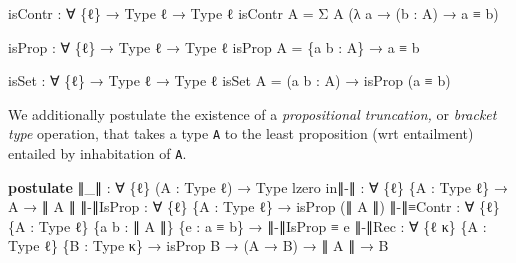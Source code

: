 \documentclass[
  11pt,
  oneside,
  article]{memoir}
\newenvironment{Shaded}{}{}
\newcommand{\KeywordTok}[1]{\textcolor[rgb]{0.00,0.44,0.13}{\textbf{#1}}}
\newcommand{\NormalTok}[1]{#1}
\newcommand{\OtherTok}[1]{\textcolor[rgb]{0.00,0.44,0.13}{#1}}
\theoremstyle{definition}
\theoremstyle{plain}
\newcommand{\0}{\textsf{0}}
\newcommand{\1}{\tn{\textsf{1}}}
\begin{document}
\begin{Shaded}
\begin{Highlighting}[]
\NormalTok{isContr }\OtherTok{:} \OtherTok{∀} \OtherTok{\{}\NormalTok{ℓ}\OtherTok{\}} \OtherTok{→}\NormalTok{ Type ℓ }\OtherTok{→}\NormalTok{ Type ℓ}
\NormalTok{isContr A }\OtherTok{=}\NormalTok{ Σ A }\OtherTok{(λ}\NormalTok{ a }\OtherTok{→} \OtherTok{(}\NormalTok{b }\OtherTok{:}\NormalTok{ A}\OtherTok{)} \OtherTok{→}\NormalTok{ a ≡ b}\OtherTok{)}

\NormalTok{isProp }\OtherTok{:} \OtherTok{∀} \OtherTok{\{}\NormalTok{ℓ}\OtherTok{\}} \OtherTok{→}\NormalTok{ Type ℓ }\OtherTok{→}\NormalTok{ Type ℓ}
\NormalTok{isProp A }\OtherTok{=} \OtherTok{\{}\NormalTok{a b }\OtherTok{:}\NormalTok{ A}\OtherTok{\}} \OtherTok{→}\NormalTok{ a ≡ b}

\NormalTok{isSet }\OtherTok{:} \OtherTok{∀} \OtherTok{\{}\NormalTok{ℓ}\OtherTok{\}} \OtherTok{→}\NormalTok{ Type ℓ }\OtherTok{→}\NormalTok{ Type ℓ}
\NormalTok{isSet A }\OtherTok{=} \OtherTok{(}\NormalTok{a b }\OtherTok{:}\NormalTok{ A}\OtherTok{)} \OtherTok{→}\NormalTok{ isProp }\OtherTok{(}\NormalTok{a ≡ b}\OtherTok{)}
\end{Highlighting}
\end{Shaded}

We additionally postulate the existence of a \emph{propositional
truncation,} or \emph{bracket type} operation, that takes a type
\texttt{A} to the least proposition (wrt entailment) entailed by
inhabitation of \texttt{A}.

\begin{Shaded}
\begin{Highlighting}[]
\KeywordTok{postulate}
\NormalTok{    ∥}\OtherTok{\_}\NormalTok{∥ }\OtherTok{:} \OtherTok{∀} \OtherTok{\{}\NormalTok{ℓ}\OtherTok{\}} \OtherTok{(}\NormalTok{A }\OtherTok{:}\NormalTok{ Type ℓ}\OtherTok{)} \OtherTok{→}\NormalTok{ Type lzero}
\NormalTok{    in∥{-}∥ }\OtherTok{:} \OtherTok{∀} \OtherTok{\{}\NormalTok{ℓ}\OtherTok{\}} \OtherTok{\{}\NormalTok{A }\OtherTok{:}\NormalTok{ Type ℓ}\OtherTok{\}} \OtherTok{→}\NormalTok{ A }\OtherTok{→}\NormalTok{ ∥ A ∥}
\NormalTok{    ∥{-}∥IsProp }\OtherTok{:} \OtherTok{∀} \OtherTok{\{}\NormalTok{ℓ}\OtherTok{\}} \OtherTok{\{}\NormalTok{A }\OtherTok{:}\NormalTok{ Type ℓ}\OtherTok{\}} \OtherTok{→}\NormalTok{ isProp }\OtherTok{(}\NormalTok{∥ A ∥}\OtherTok{)}
\NormalTok{    ∥{-}∥≡Contr }\OtherTok{:} \OtherTok{∀} \OtherTok{\{}\NormalTok{ℓ}\OtherTok{\}} \OtherTok{\{}\NormalTok{A }\OtherTok{:}\NormalTok{ Type ℓ}\OtherTok{\}} \OtherTok{\{}\NormalTok{a b }\OtherTok{:}\NormalTok{ ∥ A ∥}\OtherTok{\}} \OtherTok{\{}\NormalTok{e }\OtherTok{:}\NormalTok{ a ≡ b}\OtherTok{\}} 
               \OtherTok{→}\NormalTok{ ∥{-}∥IsProp ≡ e}
\NormalTok{    ∥{-}∥Rec }\OtherTok{:} \OtherTok{∀} \OtherTok{\{}\NormalTok{ℓ κ}\OtherTok{\}} \OtherTok{\{}\NormalTok{A }\OtherTok{:}\NormalTok{ Type ℓ}\OtherTok{\}} \OtherTok{\{}\NormalTok{B }\OtherTok{:}\NormalTok{ Type κ}\OtherTok{\}}
            \OtherTok{→}\NormalTok{ isProp B }\OtherTok{→} \OtherTok{(}\NormalTok{A }\OtherTok{→}\NormalTok{ B}\OtherTok{)} \OtherTok{→}\NormalTok{ ∥ A ∥ }\OtherTok{→}\NormalTok{ B}
\end{Highlighting}
\end{Shaded}
\end{document}
